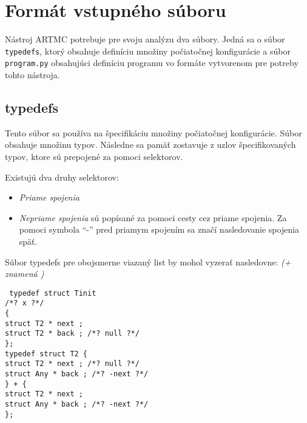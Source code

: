 \section{Formát vstupného súboru}
Nástroj ARTMC potrebuje pre svoju analýzu dva súbory. Jedná sa o súbor \texttt{typedefs}, ktorý obsahuje definíciu množiny počiatočnej konfigurácie a súbor \texttt{program.py} obsahujúci definíciu programu vo formáte vytvorenom pre potreby tohto nástroja.

\subsection{typedefs}
Tento súbor sa používa na špecifikáciu množiny počiatočnej konfigurácie. Súbor obsahuje množinu typov. Následne sa pamäť zostavuje z uzlov špecifikovaných typov, ktore sú prepojené za pomoci selektorov.

Existujú dva druhy selektorov:
\begin{itemize}
\item \textit{Priame spojenia}
\item \textit{Nepriame spojenia} sú popísané za pomoci cesty cez priame spojenia. Za pomoci symbola ``-'' pred priamym spojením sa značí nasledovanie spojenia späť.
\end{itemize}

Súbor typedefs pre obojsmerne viazaný list by mohol vyzerať nasledovne: \textit{(+ znamená )}

\texttt{
typedef struct Tinit\\                                                            
/*? x ?*/\\                                                                       
\{\\
  struct T2 * next ;\\                                                           
  struct T2 * back ; /*? null ?*/\\                                               
\};
                                                                                \\
typedef struct T2                                                           
\{\\
  struct T2 * next ; /*? null ?*/\\                                               
  struct Any * back ; /*? -next ?*/\\
\}
+
\{\\
  struct T2 * next ;\\                                                           
  struct Any * back ; /*? -next ?*/\\                                             
\};
}

